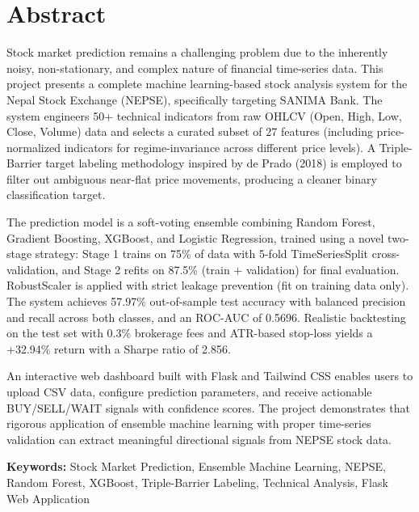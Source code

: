 \documentclass[12pt, a4paper]{report}
\begin{document}
    \setcounter{page}{1}
    
	\chapter*{Abstract}
	
	Stock market prediction remains a challenging problem due to the inherently noisy, non-stationary, and complex nature of financial time-series data. This project presents a complete machine learning-based stock analysis system for the Nepal Stock Exchange (NEPSE), specifically targeting SANIMA Bank. The system engineers 50+ technical indicators from raw OHLCV (Open, High, Low, Close, Volume) data and selects a curated subset of 27 features (including price-normalized indicators for regime-invariance across different price levels). A Triple-Barrier target labeling methodology inspired by de Prado (2018) is employed to filter out ambiguous near-flat price movements, producing a cleaner binary classification target.
	
	The prediction model is a soft-voting ensemble combining Random Forest, Gradient Boosting, XGBoost, and Logistic Regression, trained using a novel two-stage strategy: Stage 1 trains on 75\% of data with 5-fold TimeSeriesSplit cross-validation, and Stage 2 refits on 87.5\% (train + validation) for final evaluation. RobustScaler is applied with strict leakage prevention (fit on training data only). The system achieves 57.97\% out-of-sample test accuracy with balanced precision and recall across both classes, and an ROC-AUC of 0.5696. Realistic backtesting on the test set with 0.3\% brokerage fees and ATR-based stop-loss yields a +32.94\% return with a Sharpe ratio of 2.856.
	
	An interactive web dashboard built with Flask and Tailwind CSS enables users to upload CSV data, configure prediction parameters, and receive actionable BUY/SELL/WAIT signals with confidence scores. The project demonstrates that rigorous application of ensemble machine learning with proper time-series validation can extract meaningful directional signals from NEPSE stock data.
	
	\textbf{Keywords:} Stock Market Prediction, Ensemble Machine Learning, NEPSE, Random Forest, XGBoost, Triple-Barrier Labeling, Technical Analysis, Flask Web Application
	
\end{document}

